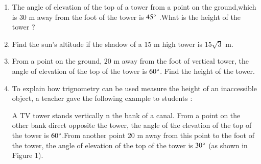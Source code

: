 \begin{enumerate}[label=\thesubsection.\arabic*.,ref=\thesubsection.\theenumi]
	\hfill{}\item The angle of elevation of the top of a tower from a point on the ground,which is $30$ m away from the foot of the tower is $45\degree$ .What is the height of the tower ?
	\hfill{}\item Find the sun's altitude if the shadow of a 15 m high tower is ${15}\sqrt{3}$ m.
	\hfill{}\item From a point on the ground, $20$ m away from the foot of vertical tower, the angle of elevation of the top of the tower is $60\degree$. Find the height of the tower.
			\hfill{}
\item To explain how trignometry can be used measure the height of an inaccessible object, a teacher gave the following example to students :

		A TV tower stands vertically n the bank of a canal. From a point on the other bank direct opposite the tower, the angle of the elevation of the top of the tower is $60\degree$.From another point 20 m away from this point to the foot of the tower, the angle of elevation of the top of the tower is $30\degree$ (as shown in Figure 1).


\end{enumerate}
